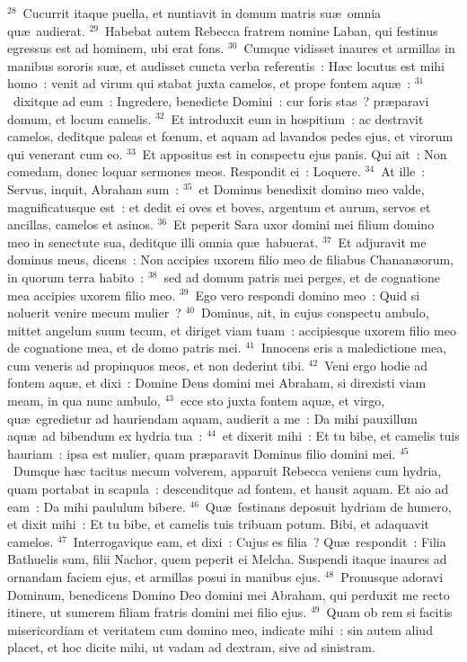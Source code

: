 ${}^{28}$~Cucurrit itaque puella, et nuntiavit in domum matris su\ae\ omnia qu\ae\ audierat.
${}^{29}$~Habebat autem Rebecca fratrem nomine Laban, qui festinus egressus est ad hominem, ubi erat fons.
${}^{30}$~Cumque vidisset inaures et armillas in manibus sororis su\ae , et audisset cuncta verba referentis~: H\ae c locutus est mihi homo~: venit ad virum qui stabat juxta camelos, et prope fontem aqu\ae~:
${}^{31}$~dixitque ad eum~: Ingredere, benedicte Domini~: cur foris stas~? pr\ae paravi domum, et locum camelis.
${}^{32}$~Et introduxit eum in hospitium~: ac destravit camelos, deditque paleas et fœnum, et aquam ad lavandos pedes ejus, et virorum qui venerant cum eo.
${}^{33}$~Et appositus est in conspectu ejus panis. Qui ait~: Non comedam, donec loquar sermones meos. Respondit ei~: Loquere.
${}^{34}$~At ille~: Servus, inquit, Abraham sum~:
${}^{35}$~et Dominus benedixit domino meo valde, magnificatusque est~: et dedit ei oves et boves, argentum et aurum, servos et ancillas, camelos et asinos.
${}^{36}$~Et peperit Sara uxor domini mei filium domino meo in senectute sua, deditque illi omnia qu\ae\ habuerat.
${}^{37}$~Et adjuravit me dominus meus, dicens~: Non accipies uxorem filio meo de filiabus Chanan\ae orum, in quorum terra habito~:
${}^{38}$~sed ad domum patris mei perges, et de cognatione mea accipies uxorem filio meo.
${}^{39}$~Ego vero respondi domino meo~: Quid si noluerit venire mecum mulier~?
${}^{40}$~Dominus, ait, in cujus conspectu ambulo, mittet angelum suum tecum, et diriget viam tuam~: accipiesque uxorem filio meo de cognatione mea, et de domo patris mei.
${}^{41}$~Innocens eris a maledictione mea, cum veneris ad propinquos meos, et non dederint tibi.
${}^{42}$~Veni ergo hodie ad fontem aqu\ae , et dixi~: Domine Deus domini mei Abraham, si direxisti viam meam, in qua nunc ambulo,
${}^{43}$~ecce sto juxta fontem aqu\ae , et virgo, qu\ae\ egredietur ad hauriendam aquam, audierit a me~: Da mihi pauxillum aqu\ae\ ad bibendum ex hydria tua~:
${}^{44}$~et dixerit mihi~: Et tu bibe, et camelis tuis hauriam~: ipsa est mulier, quam pr\ae paravit Dominus filio domini mei.
${}^{45}$~Dumque h\ae c tacitus mecum volverem, apparuit Rebecca veniens cum hydria, quam portabat in scapula~: descenditque ad fontem, et hausit aquam. Et aio ad eam~: Da mihi paululum bibere.
${}^{46}$~Qu\ae\ festinans deposuit hydriam de humero, et dixit mihi~: Et tu bibe, et camelis tuis tribuam potum. Bibi, et adaquavit camelos.
${}^{47}$~Interrogavique eam, et dixi~: Cujus es filia~? Qu\ae\ respondit~: Filia Bathuelis sum, filii Nachor, quem peperit ei Melcha. Suspendi itaque inaures ad ornandam faciem ejus, et armillas posui in manibus ejus.
${}^{48}$~Pronusque adoravi Dominum, benedicens Domino Deo domini mei Abraham, qui perduxit me recto itinere, ut sumerem filiam fratris domini mei filio ejus.
${}^{49}$~Quam ob rem si facitis misericordiam et veritatem cum domino meo, indicate mihi~: sin autem aliud placet, et hoc dicite mihi, ut vadam ad dextram, sive ad sinistram.


